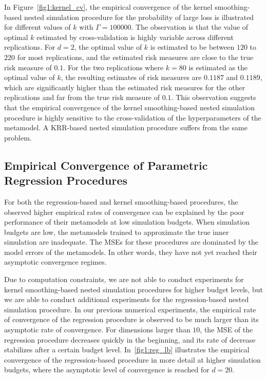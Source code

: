 In Figure~\ref{fig1:kernel_cv}, the empirical convergence of the kernel smoothing-based nested simulation procedure for the probability of large loss is illustrated for different values of $k$ with $\Gamma = \num{100000}$.
The observation is that the value of optimal $k$ estimated by cross-validation is highly variable across different replications.
For $d = 2$, the optimal value of $k$ is estimated to be between $120$ to $220$ for most replications, and the estimated risk measures are close to the true risk measure of $0.1$.
For the two replications where $k = 80$ is estimated as the optimal value of $k$, the resulting estimates of risk measures are $0.1187$ and $0.1189$, which are significantly higher than the estimated risk measures for the other replications and far from the true risk measure of $0.1$.
This observation suggests that the empirical convergence of the kernel smoothing-based nested simulation procedure is highly sensitive to the cross-validation of the hyperparameters of the metamodel.
A KRR-based nested simulation procedure suffers from the same problem. 

\subsection{Empirical Convergence of Parametric Regression Procedures} \label{sec1:regression-convergence}

For both the regression-based and kernel smoothing-based procedures, the observed higher empirical rates of convergence can be explained by the poor performance of their metamodels at low simulation budgets. 
When simulation budgets are low, the metamodels trained to approximate the true inner simulation are inadequate.
The MSEs for these procedures are dominated by the model errors of the metamodels.
In other words, they have not yet reached their asymptotic convergence regimes.

Due to computation constraints, we are not able to conduct experiments for kernel smoothing-based nested simulation procedures for higher budget levels, but we are able to conduct additional experiments for the regression-based nested simulation procedure.
In our previous numerical experiments, the empirical rate of convergence of the regression procedure is observed to be much larger than its asymptotic rate of convergence.
For dimensions larger than $10$, the MSE of the regression procedure decreases quickly in the beginning, and its rate of decrease stabilizes after a certain budget level.
In~\ref{fig1:reg_lb} illustrates the empirical convergence of the regression-based procedure in more detail at higher simulation budgets, where the asymptotic level of convergence is reached for $d = 20$.

